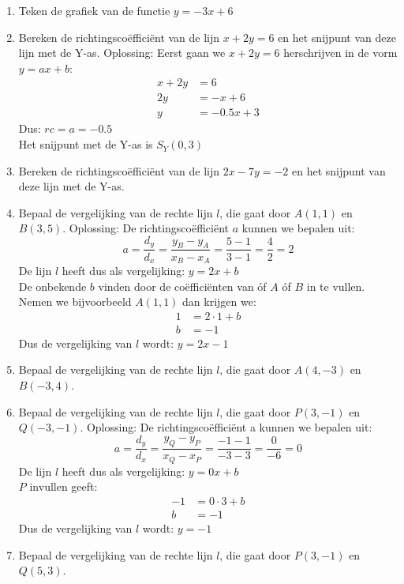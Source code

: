\begin{enumerate}
\begin{figure}[H]
            \caption{Grafiek van $y=2x+4$}
            \label{fig:placeholder}
        \end{figure}
    \item Teken de grafiek van de functie $y=-3x+6$
    \item Bereken de richtingsco\"effici\"ent van de lijn $x+2y=6$ en het snijpunt van deze lijn met de Y-as.
    Oplossing:
        Eerst gaan we $x+2y=6$ herschrijven in de vorm $y=ax+b$:
        \begin{align*}
            x+2y&=6 \\
            2y&=-x+6 \\
            y&=-0.5x+3
        \end{align*}
        Dus: $rc=a=-0.5$ \\
        Het snijpunt met de Y-as is $S_Y (0,3)$
    \item Bereken de richtingsco\"effici\"ent van de lijn $2x-7y=-2$ en het snijpunt van deze lijn met de Y-as.

	\item Bepaal de vergelijking van de rechte lijn $l$, die gaat door $A(1,1)$ en $B(3,5)$.
    Oplossing:
        De richtingsco\"effici\"ent $a$ kunnen we bepalen uit: 
        \[a=\frac{d_y}{d_x} =\frac{y_B-y_A}{x_B-x_A}=\frac{5-1}{3-1}=\frac{4}{2}=2\]
        De lijn $l$ heeft dus als vergelijking: $y=2x+b$ \\
        De onbekende $b$ vinden door de co\"effici\"enten van \'of $A$ \'of $B$ in te vullen. Nemen we bijvoorbeeld $A(1,1)$ dan krijgen we: 
        \begin{align*}
            1&=2\cdot 1+b \\
            b&=-1
        \end{align*}
        Dus de vergelijking van $l$ wordt: $y=2x-1$

    \item Bepaal de vergelijking van de rechte lijn $l$, die gaat door $A(4,-3)$ en $B(-3,4)$.

	\item Bepaal de vergelijking van de rechte lijn $l$, die gaat door $P(3,-1)$ en $Q(-3,-1)$.
    Oplossing:
        De richtingsco\"effici\"ent a kunnen we bepalen uit: 
        \[a=\frac{d_y}{d_x} =\frac{y_Q-y_P}{x_Q-x_P}=\frac{-1-1}{-3-3}=\frac{0}{-6}=0\]
        De lijn $l$ heeft dus als vergelijking: $y=0x+b$ \\
        $P$ invullen geeft: 
        \begin{align*}
            -1&=0\cdot 3+b \\
            b&=-1
        \end{align*}
        Dus de vergelijking van $l$ wordt: $y=-1$
    \item Bepaal de vergelijking van de rechte lijn $l$, die gaat door $P(3,-1)$ en $Q(5,3)$.
\end{enumerate}

